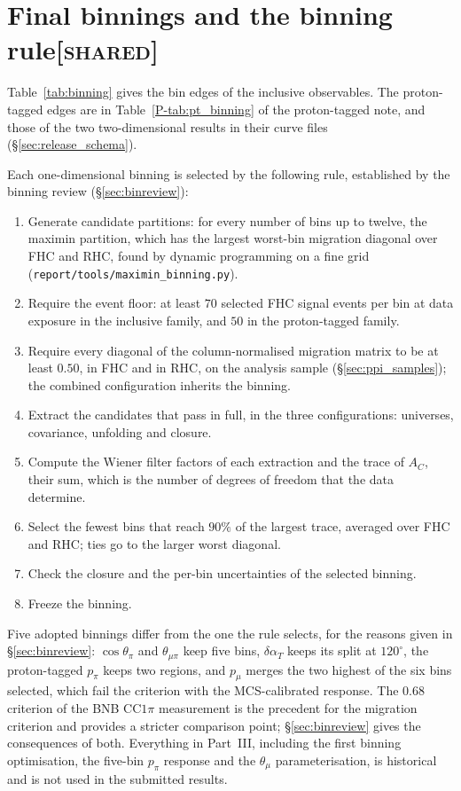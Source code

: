 \documentclass[11pt,a4paper]{article}
\newcommand{\ptref}[2]{#1~\ref{P-#2} of the proton-tagged note}
\newcommand{\scopetag}[1]{\hfill{\normalfont\small\textsc{[#1]}}}
\begin{document}
%

%

\section[Final binnings and the binning rule]{Final binnings and the binning rule\scopetag{shared}}
\label{sec:final_binning}

Table~\ref{tab:binning} gives the bin edges of the inclusive observables. The proton-tagged edges are
in \ptref{Table}{tab:pt_binning}, and those of the two two-dimensional results in their curve files
(\S\ref{sec:release_schema}).



Each one-dimensional binning is selected by the following rule, established by the binning review
(\S\ref{sec:binreview}):
\begin{enumerate}\itemsep1pt
  \item Generate candidate partitions: for every number of bins up to twelve, the maximin partition,
    which has the largest worst-bin migration diagonal over FHC and RHC, found by dynamic programming
    on a fine grid (\texttt{report/tools/maximin\_binning.py}).
  \item Require the event floor: at least $70$ selected FHC signal events per bin at data exposure in
    the inclusive family, and $50$ in the proton-tagged family.
  \item Require every diagonal of the column-normalised migration matrix to be at least $0.50$, in FHC
    and in RHC, on the analysis sample (\S\ref{sec:ppi_samples}); the combined configuration inherits
    the binning.
  \item Extract the candidates that pass in full, in the three configurations: universes, covariance,
    unfolding and closure.
  \item Compute the Wiener filter factors of each extraction and the trace of $A_C$, their sum, which
    is the number of degrees of freedom that the data determine.
  \item Select the fewest bins that reach $90\%$ of the largest trace, averaged over FHC and RHC; ties
    go to the larger worst diagonal.
  \item Check the closure and the per-bin uncertainties of the selected binning.
  \item Freeze the binning.
\end{enumerate}
Five adopted binnings differ from the one the rule selects, for the reasons given in
\S\ref{sec:binreview}: $\cos\theta_\pi$ and $\theta_{\mu\pi}$ keep five bins, $\delta\alpha_T$ keeps its
split at $120^\circ$, the proton-tagged $p_\pi$ keeps two regions, and $p_\mu$ merges the two highest of
the six bins selected, which fail the criterion with the MCS-calibrated response. The $0.68$ criterion of the BNB
CC$1\pi$ measurement is the precedent for the migration criterion and provides a stricter comparison
point; \S\ref{sec:binreview} gives the consequences of both. Everything in Part~III, including the
first binning optimisation, the five-bin $p_\pi$ response and the $\theta_\mu$ parameterisation, is
historical and is not used in the submitted results.
\end{document}
